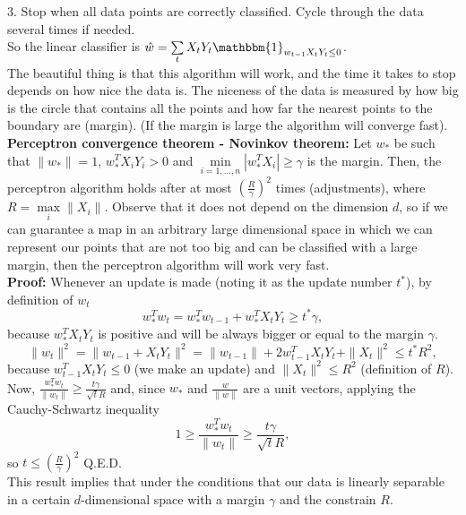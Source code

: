 \documentclass[11pt, english]{article}
\newcommand{\su}[2]{\sum\limits_{#1}^{#2}}
\begin{document}
3. Stop when all data points are correctly classified. Cycle through the data several times if needed. \\
So the linear classifier is $\hat{w}=\su{t}{}X_tY_t\mathbbm{1}_{w_{t-1}X_tY_t\leq 0}$.\\

The beautiful thing is that this algorithm will work, and the time it takes to stop depends on how nice the data is. The niceness of the data is measured by how big is the circle that contains all the points and how far the nearest points to the boundary are (margin). (If the margin is large the algorithm will converge fast).\\

\textbf{Perceptron convergence theorem - Novinkov theorem: }Let $w_*$ be such that $\|w_*\|=1$, $w_*^TX_iY_i>0$ and $\underset{i=1,\dots,n}{\min}|w_*^TX_i|\geq\gamma$ is the margin. Then, the perceptron algorithm holds after at most $\left(\frac{R}{\gamma}\right)^2$ times (adjustments), where $R=\underset{i}{\max}\|X_i\|$. Observe that it does not depend on the dimension $d$, so if we can guarantee a map in an arbitrary large dimensional space in which we can represent our points that are not too big and can be classified with a large margin, then the perceptron algorithm will work very fast.\\

\textbf{Proof:} Whenever an update is made (noting it as the update number $t^*$), by definition of $w_t$
\begin{equation}
	w_*^Tw_t= w_*^Tw_{t-1} + w_*^TX_tY_t\geq t^*\gamma,	
\end{equation}
because $w_*^TX_tY_t$ is positive and will be always bigger or equal to the margin $\gamma$.
\begin{equation}
	\|w_t\|^2=\|w_{t-1}+X_tY_t\|^2=\|w_{t-1}\|+2w_{t-1}^TX_tY_t+\|X_t\|^2\leq t^*R^2,
\end{equation} 
because $w_{t-1}^TX_tY_t\leq 0$ (we make an update) and $\|X_t\|^2\leq R^2$ (definition of $R$). Now, $\frac{w_*^Tw_t}{\|w_t\|}\geq \frac{t \gamma}{\sqrt{t}R}$ and, since $w_*$ and $\frac{w}{\|w\|}$ are a unit vectors, applying the Cauchy-Schwartz inequality 
\begin{equation}
	1\geq \frac{w_*^Tw_t}{\|w_t\|}\geq \frac{t \gamma}{\sqrt{t}R},
\end{equation} 
so $t\leq\left(\frac{R}{\gamma}\right)^2$ Q.E.D.\\

This result implies that under the conditions that our data is linearly separable in a certain $d$-dimensional space with a margin $\gamma$ and the constrain $R$.
\end{document}
